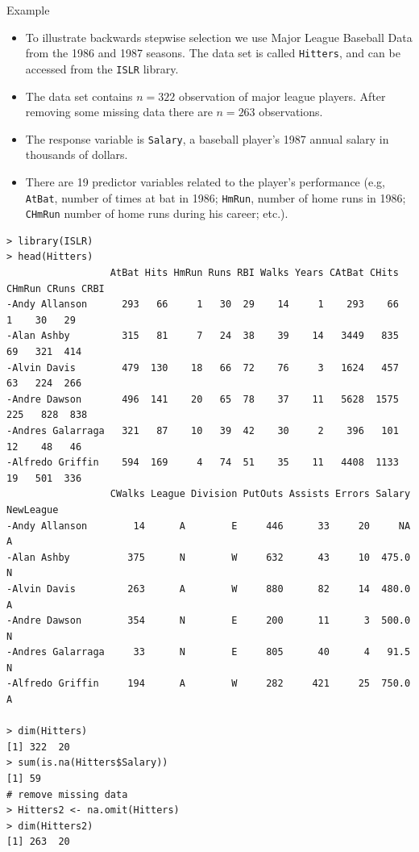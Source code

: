 \documentclass[10pt]{beamer}\usepackage[]{graphicx}\usepackage[]{color}
\begin{document}
\begin{frame}{Example}
\begin{itemize}
\item To illustrate backwards stepwise selection we use Major League Baseball Data from the 1986 and 1987 seasons.  The data set is called \texttt{Hitters}, and can be accessed from the \texttt{ISLR} library.
\vspace{5pt}
\item The data set contains $n=322$ observation of major league players.   After removing some missing data there are $n=263$ observations.
\vspace{5pt}
\item The response variable is \texttt{Salary}, a baseball player's 1987 annual salary in thousands of dollars.
\vspace{5pt}
\item There are 19 predictor variables related to the player's performance (e.g, \texttt{AtBat}, number of times at bat in 1986; \texttt{HmRun}, number of home runs in 1986; \texttt{CHmRun} number of home runs during his career; etc.).  
\end{itemize}
\end{frame}

\begin{frame}[fragile]
\scriptsize
\begin{verbatim}
> library(ISLR)
> head(Hitters)
                  AtBat Hits HmRun Runs RBI Walks Years CAtBat CHits CHmRun CRuns CRBI
-Andy Allanson      293   66     1   30  29    14     1    293    66      1    30   29
-Alan Ashby         315   81     7   24  38    39    14   3449   835     69   321  414
-Alvin Davis        479  130    18   66  72    76     3   1624   457     63   224  266
-Andre Dawson       496  141    20   65  78    37    11   5628  1575    225   828  838
-Andres Galarraga   321   87    10   39  42    30     2    396   101     12    48   46
-Alfredo Griffin    594  169     4   74  51    35    11   4408  1133     19   501  336
                  CWalks League Division PutOuts Assists Errors Salary NewLeague
-Andy Allanson        14      A        E     446      33     20     NA         A
-Alan Ashby          375      N        W     632      43     10  475.0         N
-Alvin Davis         263      A        W     880      82     14  480.0         A
-Andre Dawson        354      N        E     200      11      3  500.0         N
-Andres Galarraga     33      N        E     805      40      4   91.5         N
-Alfredo Griffin     194      A        W     282     421     25  750.0         A

> dim(Hitters)
[1] 322  20
> sum(is.na(Hitters$Salary))
[1] 59
# remove missing data
> Hitters2 <- na.omit(Hitters)
> dim(Hitters2)
[1] 263  20
\end{verbatim}
\end{frame}
\end{document}
